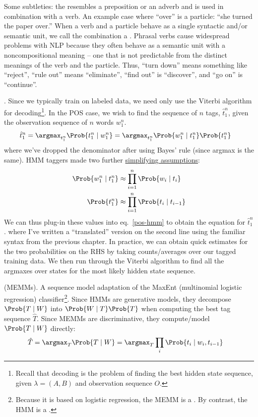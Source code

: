 \documentclass[11pt]{article}
\newcommand\myspace[1][]{\vspace{#1\bigskipamount}}
\newcommand\p{\Needspace{10\baselineskip} \noindent}
\begin{document}
Some subtleties: the  resembles a preposition or an adverb and is used in combination with a verb. An example case where ``over'' is a particle: ``she turned the paper over.'' When a verb and a particle behave as a single syntactic and/or semantic unit, we call the combination a . Phrasal verbs cause widespread problems with NLP because they often behave as a semantic unit with a noncompositional
meaning -- one that is not predictable from the distinct meanings of the verb and the particle. Thus, ``turn down'' means something like ``reject'', ``rule out'' means ``eliminate'', ``find out'' is ``discover'', and ``go on'' is ``continue''.

\myspace
\p {}. Since we typically train on labeled data, we need only use the Viterbi algorithm for decoding\footnote{Recall that decoding is the problem of finding the best hidden state sequence, given $\lambda = (A, B)$ and observation sequence $O$.}. In the POS case, we wish to find the sequence of $n$ tags, $\hat t_1^n$, given the observation sequence of $n$ words $w_1^n$. 
\begin{align}
\hat t_1^n &= \argmax_{t_1^n} \Prob{t_1^n \mid w_1^n} = \argmax_{t_1^n} \Prob{w_1^n \mid t_1^n} \Prob{t_1^n} \label{pos-hmm}
\end{align}
where we've dropped the denominator after using Bayes' rule (since argmax is the same). HMM taggers made two further \underline{simplifying assumptions}:
\begin{align}
	\Prob{w_1^n \mid t_1^n} &\approx \prod_{i = 1}^{n} \Prob{w_i \mid t_i} \\
	\Prob{t_1^n} &\approx \prod_{i = 1}^{n} \Prob{t_i \mid t_{i -1}}
\end{align}
We can thus plug-in these values into eq.~\ref{pos-hmm} to obtain the equation for $\hat t_1^n$.
where I've written a ``translated'' version on the second line using the familiar syntax from the previous chapter. In practice, we can obtain quick estimates for the two probabilities on the RHS by taking counts/averages over our tagged training data. We then run through the Viterbi algorithm to find all the argmaxes over states for the most likely hidden state sequence.


\myspace
\p {} (MEMMs). A sequence model adaptation of the MaxEnt (multinomial logistic regression) classifier\footnote{Because it is based on logistic regression, the MEMM is a . By contrast, the HMM is a .}. Since HMMs are generative models, they decompose $\Prob{T \mid W}$ into $\Prob{W \mid T} \Prob{T}$ when computing the best tag sequence $\hat T$. Since MEMMs are discriminative, they compute/model $\Prob{T \mid W}$ directly:
\begin{align}
	\hat T &= \argmax_T \Prob{T \mid W} = \argmax_T \prod_i \Prob{t_i \mid w_i, t_{i - 1}}
\end{align}
\end{document}
